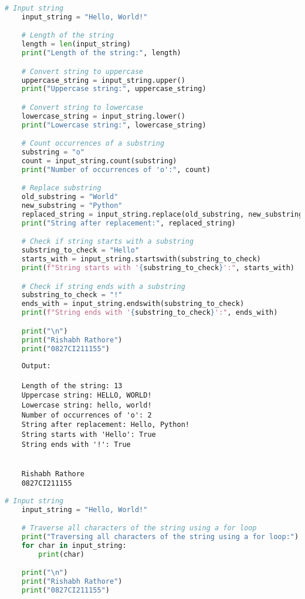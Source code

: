 \documentclass{report}
\begin{document}
\sol{}
\begin{lstlisting}[language=Python]
	# Input string
	input_string = "Hello, World!"

	# Length of the string
	length = len(input_string)
	print("Length of the string:", length)

	# Convert string to uppercase
	uppercase_string = input_string.upper()
	print("Uppercase string:", uppercase_string)

	# Convert string to lowercase
	lowercase_string = input_string.lower()
	print("Lowercase string:", lowercase_string)

	# Count occurrences of a substring
	substring = "o"
	count = input_string.count(substring)
	print("Number of occurrences of 'o':", count)

	# Replace substring
	old_substring = "World"
	new_substring = "Python"
	replaced_string = input_string.replace(old_substring, new_substring)
	print("String after replacement:", replaced_string)

	# Check if string starts with a substring
	substring_to_check = "Hello"
	starts_with = input_string.startswith(substring_to_check)
	print(f"String starts with '{substring_to_check}':", starts_with)

	# Check if string ends with a substring
	substring_to_check = "!"
	ends_with = input_string.endswith(substring_to_check)
	print(f"String ends with '{substring_to_check}':", ends_with)

	print("\n")
	print("Rishabh Rathore")
	print("0827CI211155")
\end{lstlisting}

\begin{verbatim}
	Output:

	Length of the string: 13
	Uppercase string: HELLO, WORLD!
	Lowercase string: hello, world!
	Number of occurrences of 'o': 2
	String after replacement: Hello, Python!
	String starts with 'Hello': True
	String ends with '!': True
	
	
	Rishabh Rathore
	0827CI211155
\end{verbatim}
\bigskip


\sol{}
\begin{lstlisting}[language=Python]
	# Input string
	input_string = "Hello, World!"

	# Traverse all characters of the string using a for loop
	print("Traversing all characters of the string using a for loop:")
	for char in input_string:
		print(char)

	print("\n")
	print("Rishabh Rathore")
	print("0827CI211155")
\end{lstlisting}
\end{document}
